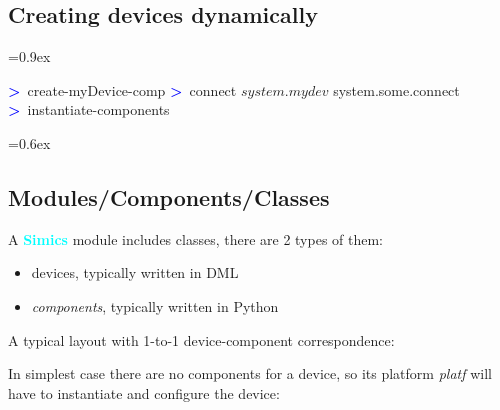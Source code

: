 \documentclass[8pt]{extarticle}
\newenvironment{code}[1][]{%
\begin{prebox}[#1]\obeylines%
\fontdimen2\font=0.9ex%
}{%
\end{prebox}%
\fontdimen2\font=0.6ex%
}
\newcommand{\sprompt}{\textcolor{blue}{\textbf{>}\ }}
\newcommand{\p}[1]{\textit{\large#1}}
\newcommand{\Simics}{\textcolor{cyan}{\textbf{Simics}}}
\newlength{\MyLen}
\begin{document}
\begin{multicols*}{3}
\begin{tabular}{p{\the\MyLen}p{\linewidth-\the\MyLen-0.8cm}}
    \end{tabular}

\subsection{Creating devices dynamically}
\begin{code}
\sprompt create-myDevice-comp
\sprompt connect $system.mydev$ system.some.connect
\sprompt instantiate-components
\end{code}

\subsection{Modules/Components/Classes}
A \Simics{} module includes classes, there are 2 types of them:
        \begin{itemize}
            \item devices, typically written in DML
            \item \textit{components}, typically written in Python
        \end{itemize}
%
%
%


A typical layout with 1-to-1 device-component correspondence:


In simplest case there are no components for a device, so its
platform \p{platf} will have to instantiate and configure the device:


\end{multicols*}
\end{document}
